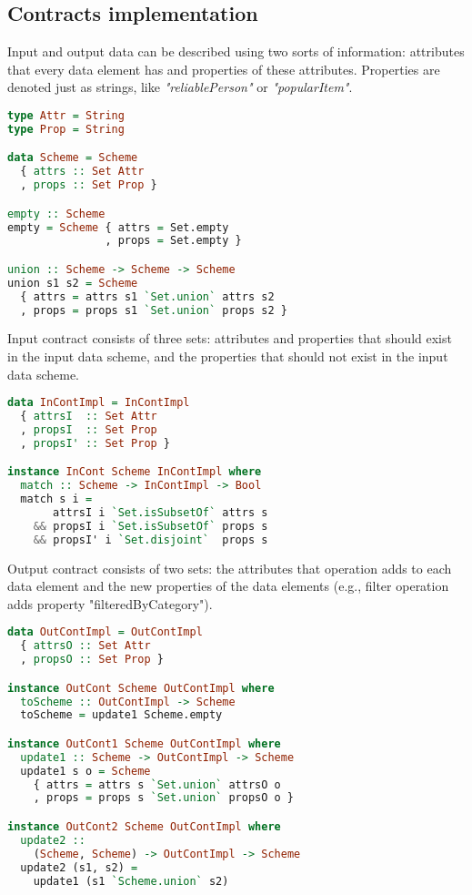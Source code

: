 \subsection{Contracts implementation}

Input and output data can be described using two sorts of information: attributes that every data element has and properties of these attributes.
Properties are denoted just as strings, like {\em "reliablePerson"} or {\em "popularItem"}.

\begin{lstlisting}[language=Haskell]
type Attr = String
type Prop = String

data Scheme = Scheme
  { attrs :: Set Attr
  , props :: Set Prop }

empty :: Scheme
empty = Scheme { attrs = Set.empty
               , props = Set.empty }

union :: Scheme -> Scheme -> Scheme
union s1 s2 = Scheme
  { attrs = attrs s1 `Set.union` attrs s2
  , props = props s1 `Set.union` props s2 }
\end{lstlisting}

Input contract consists of three sets:
attributes and properties that should exist in the input data scheme,
and the properties that should not exist in the input data scheme.

\begin{lstlisting}[language=Haskell]
data InContImpl = InContImpl
  { attrsI  :: Set Attr
  , propsI  :: Set Prop
  , propsI' :: Set Prop }

instance InCont Scheme InContImpl where
  match :: Scheme -> InContImpl -> Bool
  match s i =
       attrsI i `Set.isSubsetOf` attrs s
    && propsI i `Set.isSubsetOf` props s
    && propsI' i `Set.disjoint`  props s
\end{lstlisting}

Output contract consists of two sets:
the attributes that operation adds to each data element and the new properties of the data elements (e.g., filter operation adds property "filteredByCategory").

\begin{lstlisting}[language=Haskell]
data OutContImpl = OutContImpl
  { attrsO :: Set Attr
  , propsO :: Set Prop }

instance OutCont Scheme OutContImpl where
  toScheme :: OutContImpl -> Scheme
  toScheme = update1 Scheme.empty

instance OutCont1 Scheme OutContImpl where
  update1 :: Scheme -> OutContImpl -> Scheme
  update1 s o = Scheme
    { attrs = attrs s `Set.union` attrsO o
    , props = props s `Set.union` propsO o }

instance OutCont2 Scheme OutContImpl where
  update2 ::
    (Scheme, Scheme) -> OutContImpl -> Scheme
  update2 (s1, s2) =
    update1 (s1 `Scheme.union` s2)
\end{lstlisting}

